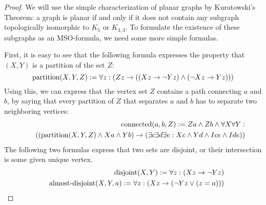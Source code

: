 \documentclass{llncs}
\begin{document}
\begin{proof}
We will use the simple characterization of planar graphs by Kuratowski's Theorem:
a graph is planar if and only if it does not contain any subgraph topologically isomorphic to $K_5$ or $K_{3,3}$.
To formulate the existence of these subgraphs as an MSO-formula, we need some more simple formulas.

First, it is easy to see that the following formula expresses the property that $(X,Y)$ is a partition of the set $Z$:
$$\textup{partition}(X,Y,Z) := \forall z:
\left( Zz  \rightarrow
\left(
\left( Xz \rightarrow \neg Yz \right) \land \left( \neg Xz \rightarrow Yz \right)
\right)
\right)
$$
Using this, we can express that the vertex set $Z$ contains a path connecting $a$ and $b$, by saying that
every partition of $Z$ that separates $a$ and $b$ has to separate two neighboring vertices:
\begin{eqnarray*}
& &
\textup{connected}(a,b,Z) := Za \land Zb \land \forall X \forall Y: \\
& & \quad \left(
\left( \textup{partition}(X,Y,Z) \land Xa \land Yb  \right) \rightarrow
\left( \exists c \exists d \exists e: Xc \land Yd \land Ice \land Ide \right)
\right)
\end{eqnarray*}
The following two formulas express that two sets are disjoint, or their intersection is some given unique vertex.
\begin{eqnarray*}
& &
\textup{disjoint}(X,Y) := \forall z: (Xz \rightarrow \neg Yz) \\
& &
\textup{almost-disjoint}(X,Y,a) := \forall z: (Xz \rightarrow (\neg Yz \lor (z=a)))
\end{eqnarray*}


\end{proof}
\end{document}
